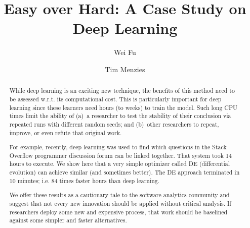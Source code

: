 \documentclass[sigconf,review, anonymous]{acmart}
\theoremstyle{break}
\begin{document}
 
\title{Easy over Hard: A Case Study on Deep Learning}


\author{Wei Fu}

\author{Tim Menzies}
 
\begin{abstract}
While deep learning is an exciting new technique, the benefits of this
method need to be  assessed w.r.t. its computational cost. 
This is particularly important for deep learning since these learners need 
 hours (to  weeks) to train the model.
Such long CPU times limit the ability
of (a)~a researcher to test
the stability of their conclusion
via repeated runs with different random seeds;
and (b)~other researchers to repeat, improve, or even refute that original work.

For example, recently,    deep learning
was used to  find which
questions  in the Stack Overflow programmer discussion
forum can be linked together. That system
took 14 hours to execute.
We show here that a very simple optimizer called DE (differential evolution)
can achieve  similar (and sometimes better). The DE approach  terminated in 10 minutes;
i.e. 84 times faster 
hours than  deep learning.

We offer these results as a cautionary tale to the software analytics community and suggest that not
every new innovation should be applied without critical analysis. If researchers deploy some new and expensive process, that work should be baselined against some simpler and faster alternatives.

\end{abstract}
\end{document}
